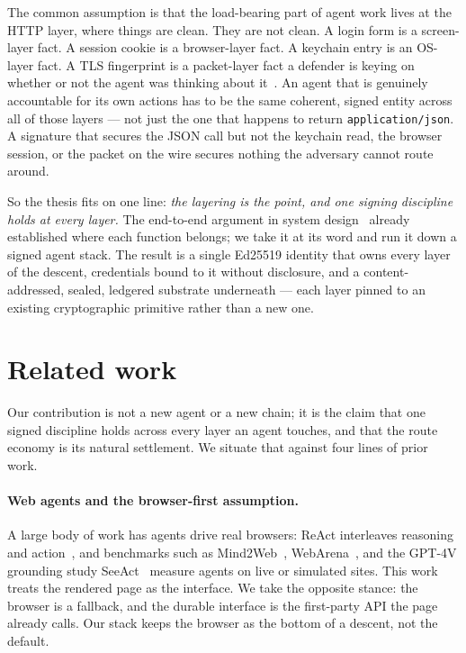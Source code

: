 \documentclass[11pt]{article}
\begin{document}
The common assumption is that the load-bearing part of agent work lives at the HTTP
layer, where things are clean. They are not clean. A login form is a screen-layer
fact. A session cookie is a browser-layer fact. A keychain entry is an OS-layer
fact. A TLS fingerprint is a packet-layer fact a defender is keying on whether or
not the agent was thinking about it~\cite{ja3,ja4}. An agent that is genuinely
accountable for its own actions has to be the same coherent, signed entity across
all of those layers --- not just the one that happens to return
\texttt{application/json}. A signature that secures the JSON call but not the
keychain read, the browser session, or the packet on the wire secures nothing the
adversary cannot route around.

So the thesis fits on one line: \emph{the layering is the point, and one signing
discipline holds at every layer.} The end-to-end argument in system
design~\cite{e2e} already established where each function belongs; we take it at its
word and run it down a signed agent stack. The result is a single Ed25519 identity
that owns every layer of the descent, credentials bound to it without disclosure,
and a content-addressed, sealed, ledgered substrate underneath --- each layer
pinned to an existing cryptographic primitive rather than a new one.


\section{Related work}

Our contribution is not a new agent or a new chain; it is the claim that one signed
discipline holds across every layer an agent touches, and that the route economy is
its natural settlement. We situate that against four lines of prior work.

\paragraph{Web agents and the browser-first assumption.} A large body of work has
agents drive real browsers: ReAct interleaves reasoning and action~\cite{react},
and benchmarks such as Mind2Web~\cite{mind2web}, WebArena~\cite{webarena}, and the
GPT-4V grounding study SeeAct~\cite{seeact} measure agents on live or simulated
sites. This work treats the rendered page as the interface. We take the opposite
stance: the browser is a fallback,
and the durable interface is the first-party API the page already calls. Our stack
keeps the browser as the bottom of a descent, not the default.
\end{document}
